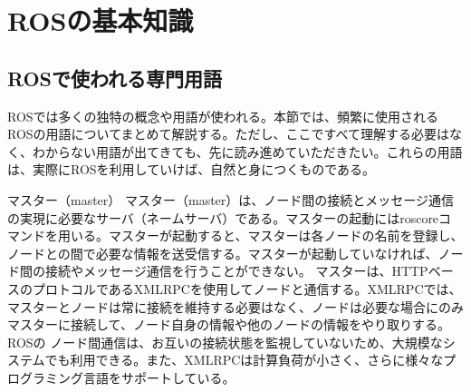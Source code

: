 
\chapter{ROSの基本知識}

\section{ROSで使われる専門用語}
\label{section:terms}

ROSでは多くの独特の概念や用語が使われる。本節では、頻繁に使用されるROSの用語についてまとめて解説する。ただし、ここですべて理解する必要はなく、わからない用語が出てきても、先に読み進めていただきたい。これらの用語は、実際にROSを利用していけば、自然と身につくものである。


\begin{term}{マスター（master）}
マスター（master）は、ノード間の接続とメッセージ通信の実現に必要なサーバ（ネームサーバ）である。マスターの起動にはroscoreコマンドを用いる。マスターが起動すると、マスターは各ノードの名前を登録し、ノードとの間で必要な情報を送受信する。マスターが起動していなければ、ノード間の接続やメッセージ通信を行うことができない。
マスターは、HTTPベースのプロトコルであるXMLRPCを使用してノードと通信する。XMLRPCでは、マスターとノードは常に接続を維持する必要はなく、ノードは必要な場合にのみマスターに接続して、ノード自身の情報や他のノードの情報をやり取りする。ROSの ノード間通信は、お互いの接続状態を監視していないため、大規模なシステムでも利用できる。また、XMLRPCは計算負荷が小さく、さらに様々なプログラミング言語をサポートしている。
\end{term}


